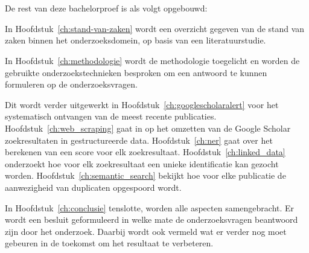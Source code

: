 \section{}%
\label{sec:opzet-bachelorproef}


De rest van deze bachelorproef is als volgt opgebouwd:

In Hoofdstuk~\ref{ch:stand-van-zaken} wordt een overzicht gegeven van de stand van zaken binnen het onderzoeksdomein, op basis van een literatuurstudie.

In Hoofdstuk~\ref{ch:methodologie} wordt de methodologie toegelicht en worden de gebruikte onderzoekstechnieken besproken om een antwoord te kunnen formuleren op de onderzoeksvragen.

Dit wordt verder uitgewerkt in Hoofdstuk~\ref{ch:googlescholaralert} voor het systematisch ontvangen van de meest recente publicaties. Hoofdstuk~\ref{ch:web_scraping} gaat in op het omzetten van de Google Scholar zoekresultaten in gestructureerde data. Hoofdstuk~\ref{ch:ner} gaat over het berekenen van een score voor elk zoekresultaat. Hoofdstuk~\ref{ch:linked_data} onderzoekt hoe voor elk zoekresultaat een unieke identificatie kan gezocht worden. Hoofdstuk~\ref{ch:semantic_search} bekijkt hoe voor elke publicatie de aanwezigheid van duplicaten opgespoord wordt.


In Hoofdstuk~\ref{ch:conclusie} tenslotte, worden alle aspecten samengebracht. Er wordt een besluit geformuleerd in welke mate de onderzoeksvragen beantwoord zijn door het onderzoek. Daarbij wordt ook vermeld wat er verder nog moet gebeuren in de toekomst om het resultaat te verbeteren.